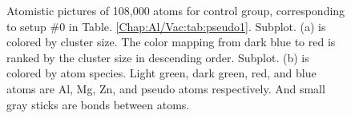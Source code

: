 \newpage
\begingroup
\begin{figure}[!ht]
  \centering
\caption[Atomistic pictures of 108,000 atoms for the control group of the sensitivity test.]{Atomistic pictures of 108,000 atoms for control group, corresponding to setup \#0 in Table. \ref{Chap:Al/Vac:tab:pseudo1}. Subplot. (a) is colored by cluster size. The color mapping from dark blue to red is ranked by the cluster size in descending order. Subplot. (b) is colored by atom species. Light green, dark green, red, and blue atoms are Al, Mg, Zn, and pseudo atoms respectively. And small gray sticks are bonds between atoms.}
\label{Chap:Al/Vac:fig:sens_control}
\end{figure}
\endgroup


